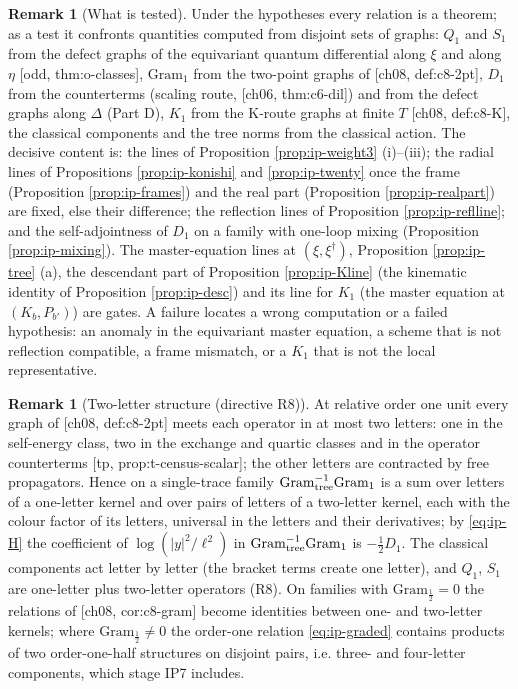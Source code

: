 \documentclass[11pt]{report}
\theoremstyle{plain}
\theoremstyle{definition}
\newtheorem{remark}[theorem]{Remark}
\numberwithin{equation}{chapter}
\newcommand{\Gt}{\mathrm{Gram}_{\rm tree}}
\newcommand{\Go}{\mathrm{Gram}_{1}}
\begin{document}
\begin{remark}[What is tested]
\label{rem:ip-tested}
Under the hypotheses every relation is a theorem; as a test it confronts quantities computed from disjoint sets of graphs: $Q_1$ and $S_1$ from the defect graphs of the equivariant quantum differential along $\xi$ and along $\eta$ [odd, thm:o-classes], $\Go$ from the two-point graphs of [ch08, def:c8-2pt], $D_1$ from the counterterms (scaling route, [ch06, thm:c6-dil]) and from the defect graphs along $\Delta$ (Part D), $K_1$ from the K-route graphs at finite $T$ [ch08, def:c8-K], the classical components and the tree norms from the classical action. The decisive content is: the lines of Proposition \ref{prop:ip-weight3} (i)--(iii); the radial lines of Propositions \ref{prop:ip-konishi} and \ref{prop:ip-twenty} once the frame (Proposition \ref{prop:ip-frames}) and the real part (Proposition \ref{prop:ip-realpart}) are fixed, else their difference; the reflection lines of Proposition \ref{prop:ip-reflline}; and the self-adjointness of $D_1$ on a family with one-loop mixing (Proposition \ref{prop:ip-mixing}). The master-equation lines at $(\xi,\xi^\dagger)$, Proposition \ref{prop:ip-tree} (a), the descendant part of Proposition \ref{prop:ip-Kline} (the kinematic identity of Proposition \ref{prop:ip-desc}) and its line for $K_1$ (the master equation at $(K_b,P_{b'})$) are gates. A failure locates a wrong computation or a failed hypothesis: an anomaly in the equivariant master equation, a scheme that is not reflection compatible, a frame mismatch, or a $K_1$ that is not the local representative.
\end{remark}

\begin{remark}[Two-letter structure (directive R8)]
\label{rem:ip-twobody}
At relative order one unit every graph of [ch08, def:c8-2pt] meets each operator in at most two letters: one in the self-energy class, two in the exchange and quartic classes and in the operator counterterms [tp, prop:t-census-scalar]; the other letters are contracted by free propagators. Hence on a single-trace family $\Gt^{-1}\Go$ is a sum over letters of a one-letter kernel and over pairs of letters of a two-letter kernel, each with the colour factor of its letters, universal in the letters and their derivatives; by \eqref{eq:ip-H} the coefficient of $\log(|y|^2/\ell^2)$ in $\Gt^{-1}\Go$ is $-\tfrac12D_1$. The classical components act letter by letter (the bracket terms create one letter), and $Q_1$, $S_1$ are one-letter plus two-letter operators (R8). On families with $\mathrm{Gram}_{\frac12}=0$ the relations of [ch08, cor:c8-gram] become identities between one- and two-letter kernels; where $\mathrm{Gram}_{\frac12}\neq0$ the order-one relation \eqref{eq:ip-graded} contains products of two order-one-half structures on disjoint pairs, i.e. three- and four-letter components, which stage IP7 includes.
\end{remark}
\end{document}
